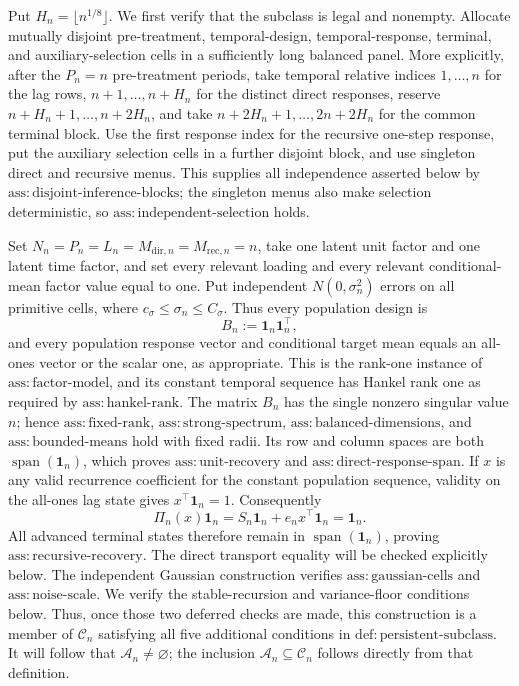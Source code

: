 Put \(H_n=\lfloor n^{1/8}\rfloor\).  We first verify that the subclass is legal and nonempty.  Allocate mutually disjoint pre-treatment, temporal-design, temporal-response, terminal, and auxiliary-selection cells in a sufficiently long balanced panel.  More explicitly, after the \(P_n=n\) pre-treatment periods, take temporal relative indices \(1,\ldots,n\) for the lag rows, \(n+1,\ldots,n+H_n\) for the distinct direct responses, reserve \(n+H_n+1,\ldots,n+2H_n\), and take \(n+2H_n+1,\ldots,2n+2H_n\) for the common terminal block.  Use the first response index for the recursive one-step response, put the auxiliary selection cells in a further disjoint block, and use singleton direct and recursive menus.  This supplies all independence asserted below by \(\mathrm{ass{:}disjoint\mbox{-}inference\mbox{-}blocks}\); the singleton menus also make selection deterministic, so \(\mathrm{ass{:}independent\mbox{-}selection}\) holds.

Set \(N_n=P_n=L_n=M_{\mathrm{dir},n}=M_{\mathrm{rec},n}=n\), take one latent unit factor and one latent time factor, and set every relevant loading and every relevant conditional-mean factor value equal to one.  Put independent \(N(0,\sigma_n^2)\) errors on all primitive cells, where \(c_\sigma\leq\sigma_n\leq C_\sigma\).  Thus every population design is
\[
 B_n:=\boldsymbol 1_n\boldsymbol 1_n^{\top},
\]
and every population response vector and conditional target mean equals an all-ones vector or the scalar one, as appropriate.  This is the rank-one instance of \(\mathrm{ass{:}factor\mbox{-}model}\), and its constant temporal sequence has Hankel rank one as required by \(\mathrm{ass{:}hankel\mbox{-}rank}\).  The matrix \(B_n\) has the single nonzero singular value \(n\); hence \(\mathrm{ass{:}fixed\mbox{-}rank}\), \(\mathrm{ass{:}strong\mbox{-}spectrum}\), \(\mathrm{ass{:}balanced\mbox{-}dimensions}\), and \(\mathrm{ass{:}bounded\mbox{-}means}\) hold with fixed radii.  Its row and column spaces are both \(\operatorname{span}(\boldsymbol 1_n)\), which proves \(\mathrm{ass{:}unit\mbox{-}recovery}\) and \(\mathrm{ass{:}direct\mbox{-}response\mbox{-}span}\).  If \(x\) is any valid recurrence coefficient for the constant population sequence, validity on the all-ones lag state gives \(x^{\top}\boldsymbol 1_n=1\).  Consequently
\[
 \Pi_n(x)\boldsymbol 1_n
 =S_n\boldsymbol 1_n+e_nx^{\top}\boldsymbol 1_n
 =\boldsymbol 1_n.
\]
All advanced terminal states therefore remain in \(\operatorname{span}(\boldsymbol 1_n)\), proving \(\mathrm{ass{:}recursive\mbox{-}recovery}\).  The direct transport equality will be checked explicitly below.  The independent Gaussian construction verifies \(\mathrm{ass{:}gaussian\mbox{-}cells}\) and \(\mathrm{ass{:}noise\mbox{-}scale}\).  We verify the stable-recursion and variance-floor conditions below.  Thus, once those two deferred checks are made, this construction is a member of \(\mathcal C_n\) satisfying all five additional conditions in \(\mathrm{def{:}persistent\mbox{-}subclass}\).  It will follow that \(\mathcal A_n\neq\varnothing\); the inclusion \(\mathcal A_n\subseteq\mathcal C_n\) follows directly from that definition.

